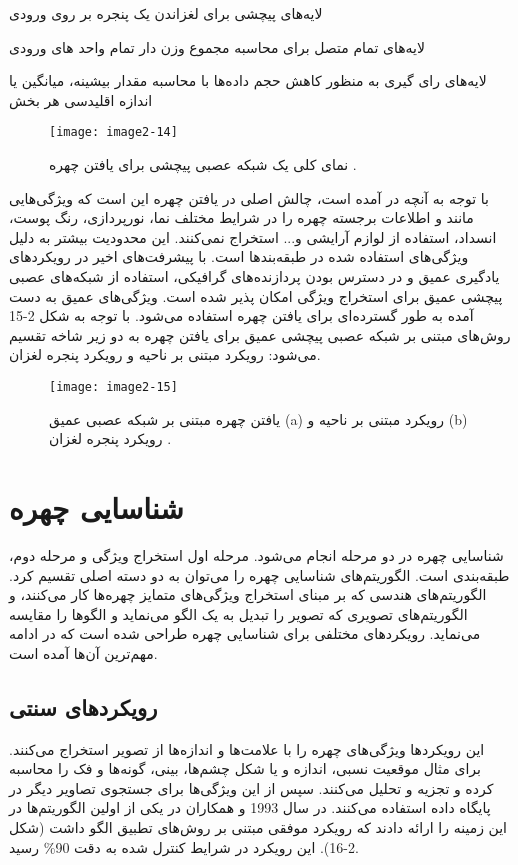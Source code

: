 \noindent
لایه‌های پیچشی  برای لغزاندن یک پنجره بر روی ورودی

\noindent
لایه‌های تمام متصل  برای محاسبه مجموع وزن دار تمام واحد های ورودی

\noindent
لایه‌های رای گیری  به منظور کاهش حجم داده‌ها با محاسبه مقدار بیشینه، میانگین یا اندازه اقلیدسی هر بخش
 
\begin{figure}[h]
\centering
  \texttt{[image: image2-14]}
  \caption{نمای کلی یک شبکه عصبی پیچشی برای یافتن چهره \cite{ref1}.}
  \label{image2-14}
\end{figure}

\noindent
با توجه به آنچه در \cite{8253595} آمده است، چالش اصلی در یافتن چهره این است که ویژگی‌هایی مانند  و  اطلاعات برجسته چهره را در شرایط مختلف نما، نورپردازی، رنگ پوست، انسداد، استفاده از لوازم آرایشی و... استخراج نمی‌کنند. این محدودیت بیشتر به دلیل ویژگی‌های استفاده شده در طبقه‌بندها است. با پیشرفت‌های اخیر در رویکردهای یادگیری عمیق و در دسترس بودن پردازنده‌های گرافیکی، استفاده از شبکه‌های عصبی پیچشی عمیق برای استخراج ویژگی امکان پذیر شده است. ویژگی‌های عمیق به دست آمده به طور گسترده‌ای برای یافتن چهره استفاده می‌شود. با توجه به شکل 2-15 روش‌های مبتنی بر شبکه عصبی پیچشی عمیق برای یافتن چهره به دو زیر شاخه تقسیم می‌شود: رویکرد مبتنی بر ناحیه و رویکرد پنجره لغزان.

\begin{figure}[h]
\centering
  \texttt{[image: image2-15]}
  \caption{یافتن چهره مبتنی بر شبکه عصبی عمیق (a) رویکرد مبتنی بر ناحیه و (b) رویکرد پنجره لغزان \cite{ref1}.}
  \label{image2-15}
\end{figure}

\section{شناسایی چهره}
شناسایی چهره در دو مرحله انجام می‌شود. مرحله اول استخراج ویژگی و مرحله دوم، طبقه‌بندی است. الگوریتم‌های شناسایی چهره را می‌توان به دو دسته اصلی تقسیم کرد. الگوریتم‌های هندسی که بر مبنای استخراج ویژگی‌های متمایز چهره‌ها کار می‌کنند، و الگوریتم‌های تصویری که تصویر را تبدیل به یک الگو می‌نماید و الگوها را مقایسه می‌نماید. رویکردهای مختلفی برای شناسایی چهره طراحی شده است که در ادامه مهم‌ترین آن‌ها آمده است.

\subsection{رویکرد‌های سنتی}
این رویکردها ویژگی‌های چهره را با علامت‌ها و اندازه‌ها از تصویر استخراج می‌کنند. برای مثال موقعیت نسبی، اندازه و یا شکل چشم‌ها، بینی، گونه‌‌ها و فک را محاسبه کرده و تجزیه و تحلیل می‌کنند. سپس از این ویژگی‌ها برای جستجوی تصاویر دیگر در پایگاه داده استفاده می‌کنند. در سال 1993  و همکاران در \cite{254061} یکی از اولین الگوریتم‌ها در این زمینه را ارائه دادند که رویکرد‌ موفقی مبتنی بر روش‌های تطبیق الگو داشت (شکل 2-16). این رویکرد در شرایط کنترل شده به دقت 90\% رسید.
 

